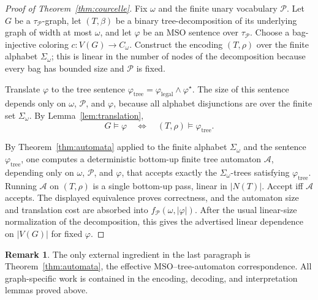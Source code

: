 \documentclass[11pt]{article}
\theoremstyle{definition}
\newtheorem*{remark}{Remark}
\newcommand{\MSO}{\ensuremath{\mathrm{MSO}}}
\newcommand{\legal}{\mathrm{legal}}
\newcommand{\Pred}{\mathcal P}
\newcommand{\Aut}{\mathcal{A}}
\begin{document}
\begin{proof}[Proof of Theorem~\ref{thm:courcelle}]
Fix \(\omega\) and the finite unary vocabulary \(\Pred\).  Let \(G\) be a
\(\tau_{\Pred}\)-graph, let \((T,\beta)\) be a binary tree-decomposition of its
underlying graph of width at most \(\omega\), and let \(\varphi\) be an \MSO{}
sentence over \(\tau_{\Pred}\).
Choose a bag-injective coloring \(c:V(G)\to C_\omega\).  Construct the encoding
\((T,\rho)\) over the finite alphabet \(\Sigma_\omega\); this is linear in the
number of nodes of the decomposition because every bag has bounded size and
\(\Pred\) is fixed.

Translate \(\varphi\) to the tree sentence \(\varphi_{\mathrm{tree}}
=\varphi_{\legal}\wedge\varphi^\star\).  The size of this sentence depends only
on \(\omega\), \(\Pred\), and \(\varphi\), because all alphabet disjunctions are
over the finite set \(\Sigma_\omega\).  By Lemma~\ref{lem:translation},
\[
  G\models\varphi
  \quad\Longleftrightarrow\quad
  (T,\rho)\models\varphi_{\mathrm{tree}}.
\]

By Theorem~\ref{thm:automata} applied to the finite alphabet \(\Sigma_\omega\) and
the sentence \(\varphi_{\mathrm{tree}}\), one computes a deterministic bottom-up
finite tree automaton \(\Aut\), depending only on \(\omega\), \(\Pred\), and
\(\varphi\), that accepts exactly the \(\Sigma_\omega\)-trees satisfying
\(\varphi_{\mathrm{tree}}\).  Running \(\Aut\) on \((T,\rho)\) is a single
bottom-up pass, linear in \(|N(T)|\).  Accept iff \(\Aut\) accepts.  The displayed equivalence proves
correctness, and the automaton size and translation cost are absorbed into
\(f_{\Pred}(\omega,|\varphi|)\).  After the usual linear-size normalization of
the decomposition, this gives the advertised linear dependence on \(|V(G)|\)
for fixed \(\varphi\).
\end{proof}

\begin{remark}
The only external ingredient in the last paragraph is Theorem~\ref{thm:automata},
the effective \MSO{}--tree-automaton correspondence.  All graph-specific work is
contained in the encoding, decoding, and interpretation lemmas proved above.
\end{remark}
\end{document}
